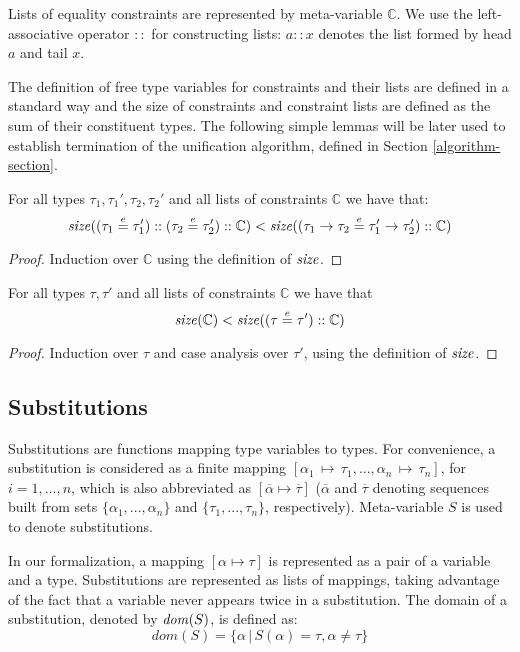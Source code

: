 Lists of equality constraints are represented by meta-variable
$\mathbb{C}$. We use the left-associative operator $::$ for
constructing lists: $a::x$ denotes the list formed by head $a$ and
tail $x$.

The definition of free type variables for constraints and their lists
are defined in a standard way and the size of constraints and
constraint lists are defined as the sum of their constituent
types. The following simple lemmas will be later used to establish
termination of the unification algorithm, defined in Section
\ref{algorithm-section}.

\begin{Lemma}\label{appsize}
For all types $\tau_1,\tau_1', \tau_2,\tau_2'$ and all lists of constraints
$\mathbb{C}$ we have that: \[\text{\it size\/}( (\tau_1\overset{e}{=} \tau_1') :: (\tau_2\overset{e}{=} \tau_2') :: \mathbb{C}) 
                           < \text{\it size\/}( (\tau_1\to\tau_2 \overset{e}{=} \tau_1'\to\tau_2') :: \mathbb{C})\]
\end{Lemma}
\begin{proof}
Induction over $\mathbb{C}$ using the definition of $\text{\it size\/}$.
\end{proof}

\begin{Lemma}\label{lengthsize}
For all types $\tau,\tau'$ and all lists of constraints $\mathbb{C}$
we have that
\[\text{\it size\/}(\mathbb{C}) < \text{\it size\/}( (\tau\overset{e}{=}\tau') :: \mathbb{C})\]
\end{Lemma}
\begin{proof}
Induction over $\tau$ and case analysis over $\tau'$, using the
definition of $\text{\it size\/}$.
\end{proof}

\subsection{Substitutions}\label{substitution}

Substitutions are functions mapping type variables to types. For
convenience, a substitution is considered as a finite mapping
$[\alpha_1\,\mapsto\,\tau_1,...,\alpha_n\,\mapsto\,\tau_n]$, for
$i=1,\ldots,n$, 
which is also abbreviated
as $[\overline{\alpha}\mapsto\overline{\tau}]$ ($\overline{\alpha}$
and $\overline{\tau}$ denoting sequences built from sets
$\{\alpha_1,...,\alpha_n\}$ and $\{\tau_1,...,\tau_n\}$,
respectively). Meta-variable $S$ is used to denote substitutions.

In our formalization, a mapping $[\alpha\mapsto\tau]$ is represented
as a pair of a variable and a type. Substitutions are represented as
lists of mappings, taking advantage of the fact that a variable never
appears twice in a substitution.  The domain of a substitution,
denoted by $\text{\it dom\/}(S)$, is defined as:
\[ dom(S) = \{\alpha\,|\,S(\alpha) = \tau, \alpha\not=\tau\} \]

